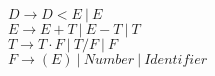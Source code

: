 \begin{center}
    $ D \rightarrow D < E \ |\  E$ \\
    $ E \rightarrow E + T \ | \  E - T \ | \ T$ \\
    $ T \rightarrow T \cdot F \ | \ T / F \ | \ F$ \\
    $ F \rightarrow (E) \ |\  Number \ | \ Identifier$
\end{center}
